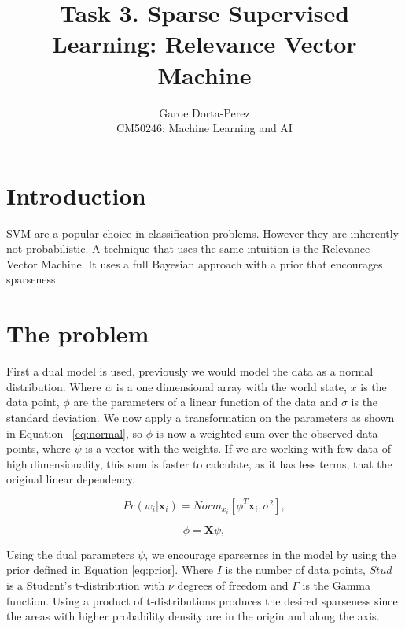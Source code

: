 \documentclass[12pt]{article}
\begin{document}
  
\title{Task 3. Sparse Supervised Learning: Relevance Vector Machine}
\author{Garoe Dorta-Perez\\
CM50246: Machine Learning and AI}
 
\maketitle
 
\section{Introduction}
 
SVM  are a popular choice in classification problems.
However they are inherently not probabilistic.
A technique that uses the same intuition is the Relevance Vector Machine.
It uses a full Bayesian approach with a prior that encourages sparseness.

\section{The problem}

First a dual model is used, previously we would model the data as a normal distribution.
Where $w$ is a one dimensional array with the world state, $x$ is the data point, $\phi$ are the parameters of a linear function of the data and $\sigma$ is the standard deviation.
We now apply a transformation on the parameters as shown in Equation ~\ref{eq:normal}, so $\phi$ is now a weighted sum over the observed data points, where $\psi$ is a vector with the weights.
If we are working with few data of high dimensionality, this sum is faster to calculate, as it has less terms, that the original linear dependency.

\begin{equation}
\label{eq:normal}
Pr(w_i|\mathbf{x}_i) = Norm_{x_i}[\phi^T \mathbf{x}_i, \sigma^2],
\end{equation}

\begin{equation}
\label{eq:dual}
\phi = \mathbf{X} \psi,
\end{equation}

Using the dual parameters $\psi$, we encourage sparsernes in the model by using the prior defined in Equation \ref{eq:prior}.
Where $I$ is the number of data points, $Stud$ is a Student's t-distribution with $\nu$ degrees of freedom and $\Gamma$ is the Gamma function.
Using a product of t-distributions produces the desired sparseness since the areas with higher probability density are in the origin and along the axis.
\end{document}
